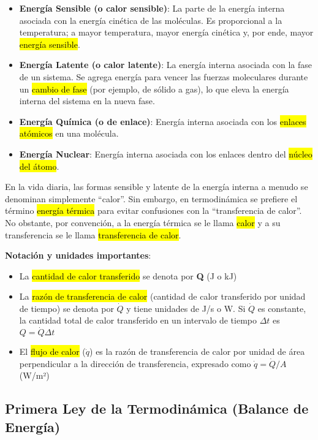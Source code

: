 \documentclass{article}
\begin{document}
    \begin{itemize}
        \item \textbf{Energía Sensible (o calor sensible)}: La parte de la energía interna asociada con la energía cinética de las moléculas. Es proporcional a la temperatura; a mayor temperatura, mayor energía cinética y, por ende, mayor \hl{energía sensible}.
        
        \item \textbf{Energía Latente (o calor latente)}: La energía interna asociada con la fase de un sistema. Se agrega energía para vencer las fuerzas moleculares durante un \hl{cambio de fase} (por ejemplo, de sólido a gas), lo que eleva la energía interna del sistema en la nueva fase.
        
        \item \textbf{Energía Química (o de enlace)}: Energía interna asociada con los \hl{enlaces atómicos} en una molécula.
        
        \item \textbf{Energía Nuclear}: Energía interna asociada con los enlaces dentro del \hl{núcleo del átomo}.
    \end{itemize}

    En la vida diaria, las formas sensible y latente de la energía interna a menudo se denominan simplemente ``calor''. Sin embargo, en termodinámica se prefiere el término \hl{energía térmica} para evitar confusiones con la ``transferencia de calor''. No obstante, por convención, a la energía térmica se le llama \hl{calor} y a su transferencia se le llama \hl{transferencia de calor}.

    \textbf{Notación y unidades importantes}:
    \begin{itemize}
        \item La \hl{cantidad de calor transferido} se denota por \textbf{Q} (J o kJ)
        \item La \hl{razón de transferencia de calor} (cantidad de calor transferido por unidad de tiempo) se denota por $\dot{Q}$ y tiene unidades de J/s o W. Si $\dot{Q}$ es constante, la cantidad total de calor transferido en un intervalo de tiempo $\Delta t$ es $Q = \dot{Q} \Delta t$
        \item El \hl{flujo de calor} ($\dot{q}$) es la razón de transferencia de calor por unidad de área perpendicular a la dirección de transferencia, expresado como $\dot{q} = \dot{Q}/A$ (W/m²)
    \end{itemize}

    \subsection{Primera Ley de la Termodinámica (Balance de Energía)}
\end{document}

